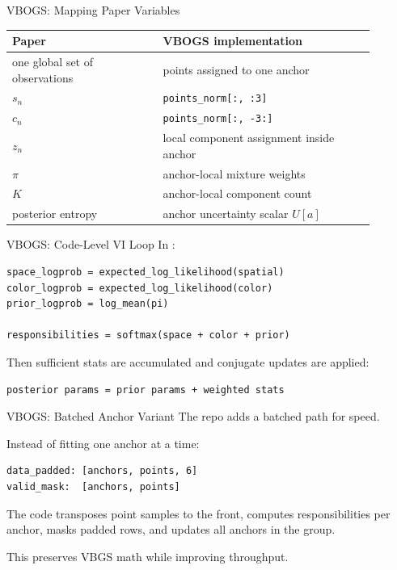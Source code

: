 \documentclass[aspectratio=169]{beamer}
\begin{document}
\begin{frame}{VBOGS: Mapping Paper Variables}
  \small
  \begin{tabular}{p{0.37\linewidth} p{0.52\linewidth}}
    \toprule
    Paper & VBOGS implementation \\
    \midrule
    one global set of observations & points assigned to one anchor \\
    \(s_n\) & \texttt{points\_norm[:, :3]} \\
    \(c_n\) & \texttt{points\_norm[:, -3:]} \\
    \(z_n\) & local component assignment inside anchor \\
    \(\pi\) & anchor-local mixture weights \\
    \(K\) & anchor-local component count \\
    posterior entropy & anchor uncertainty scalar \(U[a]\) \\
    \bottomrule
  \end{tabular}
\end{frame}

\begin{frame}[fragile]{VBOGS: Code-Level VI Loop}
  In :

\begin{verbatim}
space_logprob = expected_log_likelihood(spatial)
color_logprob = expected_log_likelihood(color)
prior_logprob = log_mean(pi)

responsibilities = softmax(space + color + prior)
\end{verbatim}

  Then sufficient stats are accumulated and conjugate updates are applied:

\begin{verbatim}
posterior params = prior params + weighted stats
\end{verbatim}
\end{frame}

\begin{frame}[fragile]{VBOGS: Batched Anchor Variant}
  The repo adds a batched path for speed.

  \vspace{0.8em}
  Instead of fitting one anchor at a time:

\begin{verbatim}
data_padded: [anchors, points, 6]
valid_mask:  [anchors, points]
\end{verbatim}

  The code transposes point samples to the front, computes responsibilities per
  anchor, masks padded rows, and updates all anchors in the group.

  \vspace{0.8em}
  This preserves VBGS math while improving throughput.
\end{frame}
\end{document}
